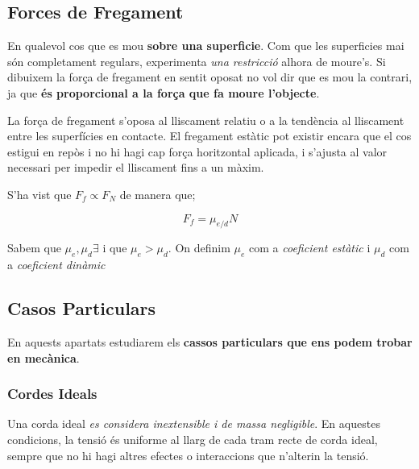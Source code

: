 \documentclass[12pt]{article}
\begin{document}
\subsection{Forces de Fregament}

En qualevol cos que es mou \textbf{sobre una superficie}. Com que les superficies mai són completament regulars, experimenta \textit{una restricció} alhora de moure's. Si dibuixem la força de fregament en sentit oposat no vol dir que es mou la contrari, ja que \textbf{és proporcional a la força que fa moure l'objecte}.

La força de fregament s’oposa al lliscament relatiu o a la tendència al lliscament entre les superfícies en contacte. El fregament estàtic pot existir encara que el cos estigui en repòs i no hi hagi cap força horitzontal aplicada, i s’ajusta al valor necessari per impedir el lliscament fins a un màxim.

S'ha vist que $F_f \propto F_N$ de manera que;

\[F_f = \mu_{e/d}N\]

\begin{center}
\end{center}

Sabem que $\mu_e, \mu_d \exists$ i que $\mu_e > \mu_d$. On definim $\mu_e$ com a \textit{coeficient estàtic} i $\mu_d$ com a \textit{coeficient dinàmic}

\subsection{Casos Particulars}

En aquests apartats estudiarem els \textbf{cassos particulars que ens podem trobar en mecànica}.

\subsubsection{Cordes Ideals}

Una corda ideal \textit{es considera inextensible i de massa negligible}. En aquestes condicions, la tensió és uniforme al llarg de cada tram recte de corda ideal, sempre que no hi hagi altres efectes o interaccions que n’alterin la tensió.
\end{document}
